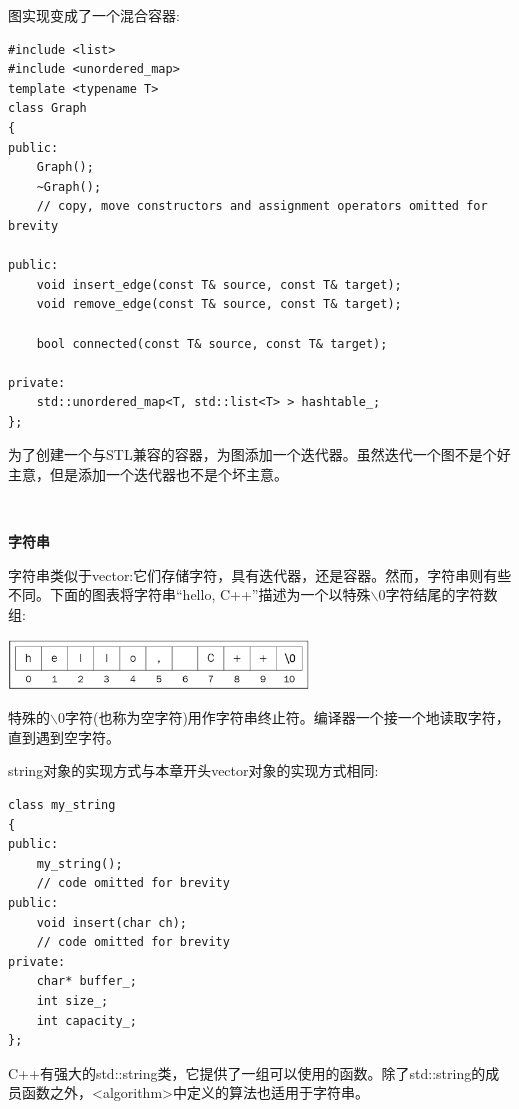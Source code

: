 图实现变成了一个混合容器: \par

\begin{lstlisting}[caption={}]
#include <list>
#include <unordered_map>
template <typename T>
class Graph
{
public:
	Graph();
	~Graph();
	// copy, move constructors and assignment operators omitted for brevity
	
public:
	void insert_edge(const T& source, const T& target);
	void remove_edge(const T& source, const T& target);
	
	bool connected(const T& source, const T& target);
	
private:
	std::unordered_map<T, std::list<T> > hashtable_;
};
\end{lstlisting}

为了创建一个与STL兼容的容器，为图添加一个迭代器。虽然迭代一个图不是个好主意，但是添加一个迭代器也不是个坏主意。 \par

\noindent\textbf{}\ \par
\textbf{字符串} \ \par
字符串类似于vector:它们存储字符，具有迭代器，还是容器。然而，字符串则有些不同。下面的图表将字符串“hello, C++”描述为一个以特殊$\backslash$0字符结尾的字符数组: \par

\begin{center}
	\includegraphics[width=0.6\textwidth]{content/Section-2/Chapter-6/30}
\end{center}

特殊的$\backslash$0字符(也称为空字符)用作字符串终止符。编译器一个接一个地读取字符，直到遇到空字符。 \par
string对象的实现方式与本章开头vector对象的实现方式相同: \par

\begin{lstlisting}[caption={}]
class my_string
{
public:
	my_string();
	// code omitted for brevity
public:
	void insert(char ch);
	// code omitted for brevity
private:
	char* buffer_;
	int size_;
	int capacity_;
};
\end{lstlisting}

C++有强大的std::string类，它提供了一组可以使用的函数。除了std::string的成员函数之外，<algorithm>中定义的算法也适用于字符串。 \par

